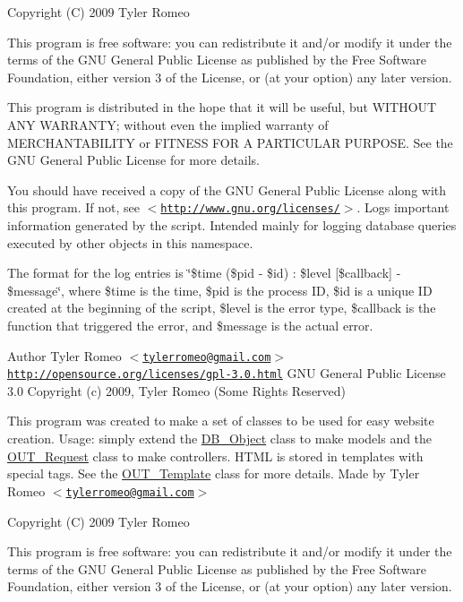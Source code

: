 Copyright (C) 2009 Tyler Romeo

This program is free software: you can redistribute it and/or modify it under the terms of the GNU General Public License as published by the Free Software Foundation, either version 3 of the License, or (at your option) any later version.

This program is distributed in the hope that it will be useful, but WITHOUT ANY WARRANTY; without even the implied warranty of MERCHANTABILITY or FITNESS FOR A PARTICULAR PURPOSE. See the GNU General Public License for more details.

You should have received a copy of the GNU General Public License along with this program. If not, see $<$\href{http://www.gnu.org/licenses/}{\tt http://www.gnu.org/licenses/}$>$. Logs important information generated by the script. Intended mainly for logging database queries executed by other objects in this namespace.

The format for the log entries is \char`\"{}\$time (\$pid -\/ \$id) : \$level \mbox{[}\$callback\mbox{]} -\/ \$message\char`\"{}, where \$time is the time, \$pid is the process ID, \$id is a unique ID created at the beginning of the script, \$level is the error type, \$callback is the function that triggered the error, and \$message is the actual error.

\begin{DoxyAuthor}{Author}
Tyler Romeo $<$\href{mailto:tylerromeo@gmail.com}{\tt tylerromeo@gmail.com}$>$  \href{http://opensource.org/licenses/gpl-3.0.html}{\tt http://opensource.org/licenses/gpl-\/3.0.html} GNU General Public License 3.0  Copyright (c) 2009, Tyler Romeo (Some Rights Reserved)
\end{DoxyAuthor}
This program was created to make a set of classes to be used for easy website creation. Usage: simply extend the \hyperlink{classDB__Object}{DB\_\-Object} class to make models and the \hyperlink{classOUT__Request}{OUT\_\-Request} class to make controllers. HTML is stored in templates with special tags. See the \hyperlink{classOUT__Template}{OUT\_\-Template} class for more details. Made by Tyler Romeo $<$\href{mailto:tylerromeo@gmail.com}{\tt tylerromeo@gmail.com}$>$

Copyright (C) 2009 Tyler Romeo

This program is free software: you can redistribute it and/or modify it under the terms of the GNU General Public License as published by the Free Software Foundation, either version 3 of the License, or (at your option) any later version.

